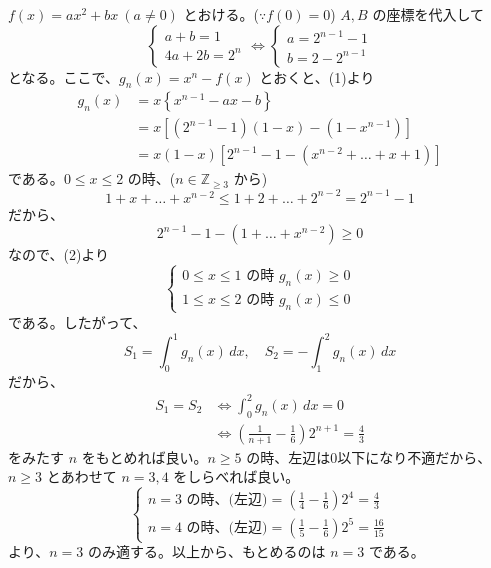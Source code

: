 \documentclass[../main.tex]{subfiles}
\begin{document}
\noindent
$f(x) = ax^2 + bx \ (a \neq 0)$ とおける。($\because f(0)=0$) $A,B$ の座標を代入して
\[
  \begin{cases} a+b=1 \\ 4a+2b=2^n
  \end{cases} \iff
  \begin{cases} a = 2^{n-1}-1 \\ b = 2 - 2^{n-1}
  \end{cases} \tag{1}
\]
となる。ここで、$g_n(x) = x^n - f(x)$ とおくと、(1)より
\begin{align*}
  g_n(x) &= x \left\{ x^{n-1} - ax - b \right\} \\
  &= x \left[ (2^{n-1}-1)(1-x) - (1-x^{n-1}) \right] \\
  &= x(1-x) \left[ 2^{n-1} - 1 - (x^{n-2} + \dots + x + 1) \right] \tag{2}
\end{align*}
である。$0 \le x \le 2$ の時、($n \in \mathbb{Z}_{\ge 3}$ から)
\[
  1 + x + \dots + x^{n-2} \le 1 + 2 + \dots + 2^{n-2} = 2^{n-1}-1
\]
だから、
\[
  2^{n-1}-1 - (1 + \dots + x^{n-2}) \ge 0
\]
なので、(2)より
\[
  \begin{cases} 0 \le x \le 1 \text{ の時 } g_n(x) \ge 0 \\ 1 \le x \le 2 \text{ の時 } g_n(x) \le 0
  \end{cases}
\]
である。したがって、
\[
  S_1 = \int_0^1 g_n(x) \, dx, \quad S_2 = -\int_1^2 g_n(x) \, dx
\]
だから、
\begin{align*}
  S_1 = S_2 &\iff \int_0^2 g_n(x) \, dx = 0 \\
  &\iff \left( \frac{1}{n+1} - \frac{1}{6} \right) 2^{n+1} = \frac{4}{3}
\end{align*}
をみたす $n$ をもとめれば良い。$n \ge 5$ の時、左辺は0以下になり不適だから、$n \ge 3$ とあわせて $n=3,4$ をしらべれば良い。
\[
  \begin{cases} n=3 \text{ の時、(左辺)} = \left(\frac{1}{4}-\frac{1}{6}\right) 2^4 = \frac{4}{3} \\ n=4 \text{ の時、(左辺)} = \left(\frac{1}{5}-\frac{1}{6}\right) 2^5 = \frac{16}{15}
  \end{cases}
\]
より、$n=3$ のみ適する。以上から、もとめるのは $n=3$ である。
\end{document}
